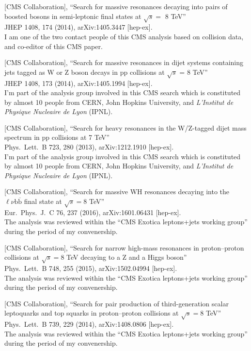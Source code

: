 \documentclass[10pt, a4paper]{article}
\begin{document}
\begin{thebibliography}{599}
[CMS Collaboration],
 ``Search for massive resonances decaying into pairs of boosted bosons in semi-leptonic final states at $\sqrt{s} =$ 8 TeV''\\
  JHEP 1408, 174 (2014), arXiv:1405.3447 [hep-ex].
  \\I am one of the two contact people of this CMS analysis based on collision data, and co-editor of this CMS paper.

[CMS Collaboration],
``Search for massive resonances in dijet systems containing jets
   tagged as W or Z boson decays in pp collisions at $ \sqrt{s} $ = 8 TeV''\\ 
JHEP 1408, 173 (2014), arXiv:1405.1994 [hep-ex].
 \\ I'm part of the analysis group involved in this CMS search which is constituted by almost 10 people from CERN, John Hopkins University, and \textit{L'Institut de Physique Nucleaire de Lyon} (IPNL).

[CMS Collaboration],
 ``Search for heavy resonances in the W/Z-tagged dijet mass spectrum in pp collisions at 7 TeV''\\
Phys.\ Lett.\ B 723, 280 (2013), arXiv:1212.1910 [hep-ex].
 \\ I'm part of the analysis group involved in this CMS search which
 is constituted by almost 10 people from CERN, John Hopkins
 University, and \textit{L'Institut de Physique Nucleaire de Lyon}
 (IPNL).

[CMS Collaboration],
 ``Search for massive WH resonances decaying into the $\ell \nu \mathrm{b} \overline{\mathrm{b}} $ final state at $\sqrt{s}=8$ TeV''\\
  Eur.\ Phys.\ J.\ C 76, 237 (2016), arXiv:1601.06431 [hep-ex].\\
The analysis was reviewed within the ``CMS Exotica leptons+jets working group'' during
the period of my convenership.

 [CMS Collaboration],
 ``Search for narrow high-mass resonances in proton–proton collisions at $\sqrt{s}=8$ TeV decaying to a Z and a Higgs boson''\\
  Phys.\ Lett.\ B 748, 255 (2015), arXiv:1502.04994 [hep-ex].\\
The analysis was reviewed within the ``CMS Exotica leptons+jets working group'' during
the period of my convenership.

  [CMS Collaboration],
 ``Search for pair production of third-generation scalar leptoquarks
  and top squarks in proton–proton collisions at $\sqrt{s}=8$ TeV''\\
  Phys.\ Lett.\ B 739, 229 (2014), arXiv:1408.0806 [hep-ex].\\
The analysis was reviewed within the ``CMS Exotica leptons+jets working group'' during
the period of my convenership.


\end{thebibliography}
\end{document}
